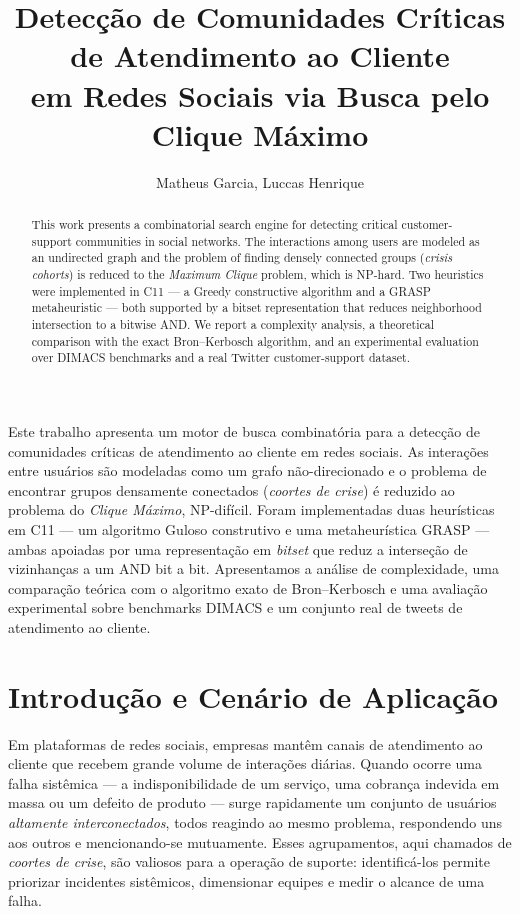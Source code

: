 \documentclass[12pt]{article}
\title{Detecção de Comunidades Críticas de Atendimento ao Cliente\\
em Redes Sociais via Busca pelo Clique Máximo}
\author{Matheus Garcia\inst{1}, Luccas Henrique\inst{1}}
\begin{document}
\maketitle

\begin{abstract}
This work presents a combinatorial search engine for detecting critical
customer-support communities in social networks. The interactions among users
are modeled as an undirected graph and the problem of finding densely connected
groups (\emph{crisis cohorts}) is reduced to the \emph{Maximum Clique} problem,
which is NP-hard. Two heuristics were implemented in C11 --- a Greedy
constructive algorithm and a GRASP metaheuristic --- both supported by a bitset
representation that reduces neighborhood intersection to a bitwise AND. We report
a complexity analysis, a theoretical comparison with the exact Bron--Kerbosch
algorithm, and an experimental evaluation over DIMACS benchmarks and a real
Twitter customer-support dataset.
\end{abstract}

\begin{resumo}
Este trabalho apresenta um motor de busca combinatória para a detecção de
comunidades críticas de atendimento ao cliente em redes sociais. As interações
entre usuários são modeladas como um grafo não-direcionado e o problema de
encontrar grupos densamente conectados (\emph{coortes de crise}) é reduzido ao
problema do \emph{Clique Máximo}, NP-difícil. Foram implementadas duas
heurísticas em C11 --- um algoritmo Guloso construtivo e uma metaheurística
GRASP --- ambas apoiadas por uma representação em \emph{bitset} que reduz a
interseção de vizinhanças a um AND bit a bit. Apresentamos a análise de
complexidade, uma comparação teórica com o algoritmo exato de Bron--Kerbosch e
uma avaliação experimental sobre benchmarks DIMACS e um conjunto real de tweets
de atendimento ao cliente.
\end{resumo}

\section{Introdução e Cenário de Aplicação}

Em plataformas de redes sociais, empresas mantêm canais de atendimento ao
cliente que recebem grande volume de interações diárias. Quando ocorre uma falha
sistêmica --- a indisponibilidade de um serviço, uma cobrança indevida em massa
ou um defeito de produto --- surge rapidamente um conjunto de usuários
\emph{altamente interconectados}, todos reagindo ao mesmo problema, respondendo
uns aos outros e mencionando-se mutuamente. Esses agrupamentos, aqui chamados de
\emph{coortes de crise}, são valiosos para a operação de suporte: identificá-los
permite priorizar incidentes sistêmicos, dimensionar equipes e medir o alcance
de uma falha.
\end{document}
